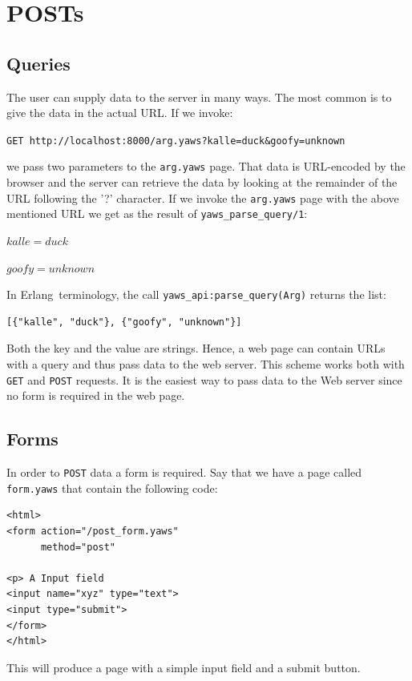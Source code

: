 \documentclass[11pt,oneside,english]{book}
\newcommand{\Erlang}            %
        {{\sc Erlang}}
\begin{document}
\section{POSTs}

\subsection{Queries}

The user can supply data to the server in many ways. The most
common is to give the data in the actual URL.
If we invoke:

\verb+GET http://localhost:8000/arg.yaws?kalle=duck&goofy=unknown+

we pass two parameters to the \verb+arg.yaws+ page.  That data is
URL-encoded by the browser and the server can retrieve the data by
looking at the remainder of the URL following the '?' character.  If
we invoke the \verb+arg.yaws+ page with the above mentioned URL we get
as the result of \verb+yaws_parse_query/1+:

$kalle = duck$

$goofy = unknown$

In \Erlang\  terminology, the call \verb+yaws_api:parse_query(Arg)+ returns
the list:
\begin{verbatim}
[{"kalle", "duck"}, {"goofy", "unknown"}]
\end{verbatim}

Both the key and the value are strings. 
Hence, a web page can contain URLs with a
query and thus pass data to the web server. This scheme works both
with \verb+GET+ and \verb+POST+ requests.  It is the easiest way to
pass data to the Web server since no form is required in the web page.


\subsection{Forms}

In order to \verb+POST+ data a form is required. Say that we have a
page called \verb+form.yaws+ that contain the following code:

\begin{verbatim}
<html>
<form action="/post_form.yaws"
      method="post"

<p> A Input field
<input name="xyz" type="text">
<input type="submit">
</form>
</html>
\end{verbatim}

This will produce a page with a simple input field and a submit button.
\end{document}
